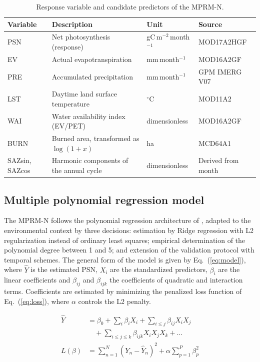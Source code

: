 \documentclass[a4paper,fleqn]{cas-dc}
\begin{document}
\begin{table}[htbp]
\caption{Response variable and candidate predictors of the MPRM-N.}\label{tbl:vars}
\begin{tabular*}{\tblwidth}{@{}LLLL@{}}
\toprule
Variable & Description & Unit & Source \\
\midrule
PSN & Net photosynthesis (response) & gC\,m$^{-2}$\,month$^{-1}$ & MOD17A2HGF \\
EV & Actual evapotranspiration & mm\,month$^{-1}$ & MOD16A2GF \\
PRE & Accumulated precipitation & mm\,month$^{-1}$ & GPM IMERG V07 \\
LST & Daytime land surface temperature & $^\circ$C & MOD11A2 \\
WAI & Water availability index (EV/PET) & dimensionless & MOD16A2GF \\
BURN & Burned area, transformed as $\log(1+x)$ & ha & MCD64A1 \\
SAZsin, SAZcos & Harmonic components of the annual cycle & dimensionless & Derived from month \\
\bottomrule
\end{tabular*}
\end{table}

\subsection{Multiple polynomial regression model}

The MPRM-N follows the polynomial regression architecture of \citet{guimaraes2024}, adapted to the environmental context by three decisions: estimation by Ridge regression with L2 regularization instead of ordinary least squares; empirical determination of the polynomial degree between 1 and 5; and extension of the validation protocol with temporal schemes. The general form of the model is given by Eq.~(\ref{eq:model}), where $\hat{Y}$ is the estimated PSN, $X_i$ are the standardized predictors, $\beta_i$ are the linear coefficients and $\beta_{ij}$ and $\beta_{ijk}$ the coefficients of quadratic and interaction terms. Coefficients are estimated by minimizing the penalized loss function of Eq.~(\ref{eq:loss}), where $\alpha$ controls the L2 penalty.
\noindent\begin{minipage}{\columnwidth}
\begin{align}
\hat{Y} &= \beta_0 + \sum_i \beta_i X_i + \sum_{i \le j} \beta_{ij} X_i X_j \nonumber\\
        &\quad + \sum_{i \le j \le k} \beta_{ijk} X_i X_j X_k + \dots \label{eq:model}\\
L(\beta) &= \sum_{n=1}^{N} \left(Y_n - \hat{Y}_n\right)^2 + \alpha \sum_{p=1}^{P} \beta_p^2 \label{eq:loss}
\end{align}
\end{minipage}
\vspace{0.5\baselineskip}
\end{document}
